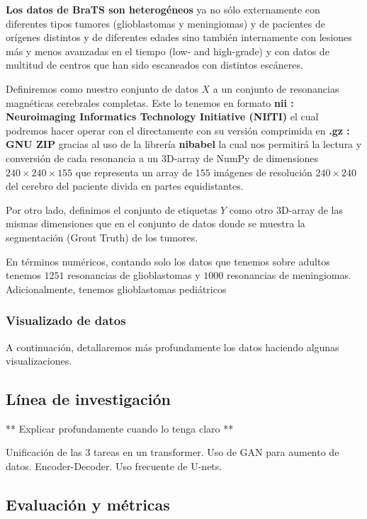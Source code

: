 \textbf{Los datos de BraTS son heterogéneos} ya no sólo externamente con diferentes tipos tumores (glioblastomas y meningiomas) y de pacientes de orígenes distintos y de diferentes edades sino también internamente con lesiones más y menos avanzadas en el tiempo (low- and high-grade) y con datos de multitud de centros que han sido escaneados con distintos escáneres.

Definiremos como nuestro conjunto de datos \textbf{$X$} a un conjunto de resonancias magnéticas cerebrales completas. Este lo tenemos en formato \textbf{nii : Neuroimaging Informatics Technology Initiative (NIfTI)} el cual podremos hacer operar con el directamente con su versión comprimida en \textbf{.gz : GNU ZIP} gracias al uso de la librería \textbf{nibabel} la cual nos permitirá la lectura y conversión de cada resonancia a un 3D-array de NumPy de dimensiones $240 \times 240 \times 155$ que representa un array de $155$ imágenes de resolución $240 \times 240$ del cerebro del paciente divida en partes equidistantes. 

Por otro lado, definimos el conjunto de etiquetas $Y$ como otro 3D-array de las mismas dimensiones que en el conjunto de datos donde se muestra la segmentación (Grout Truth) de los tumores.

En términos numéricos, contando solo los datos que tenemos sobre adultos tenemos $1251$ resonancias de glioblastomas y $1000$ resonancias de meningiomas. Adicionalmente, tenemos glioblastomas pediátricos

\subsubsection{Visualizado de datos}

A continuación, detallaremos más profundamente los datos haciendo algunas visualizaciones. 

\subsection{Línea de investigación}

** Explicar profundamente cuando lo tenga claro **

Unificación de las 3 tareas en un transformer. Uso de GAN para aumento de datos. Encoder-Decoder. Uso frecuente de U-nets.

\subsection{Evaluación y métricas}



